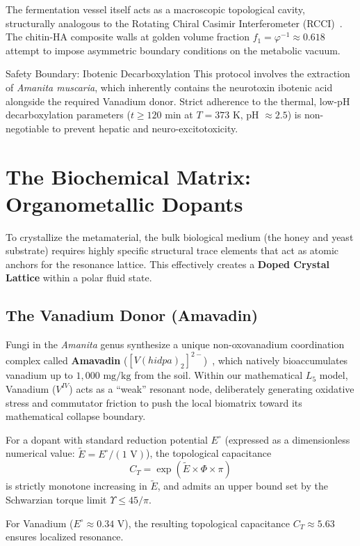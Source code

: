 The fermentation vessel itself acts as a macroscopic topological cavity, structurally analogous to the Rotating Chiral Casimir Interferometer (RCCI)~\cite{dwm_fst}. The chitin-HA composite walls at golden volume fraction $f_1 = \varphi^{-1} \approx 0.618$ attempt to impose asymmetric boundary conditions on the metabolic vacuum.

\begin{warningbox}{Safety Boundary: Ibotenic Decarboxylation}
This protocol involves the extraction of \textit{Amanita muscaria}, which inherently contains the neurotoxin ibotenic acid alongside the required Vanadium donor. Strict adherence to the thermal, low-pH decarboxylation parameters ($t \geq 120$ min at $T = 373$ K, pH $\approx 2.5$) is non-negotiable to prevent hepatic and neuro-excitotoxicity.
\end{warningbox}

\section{The Biochemical Matrix: Organometallic Dopants}

To crystallize the metamaterial, the bulk biological medium (the honey and yeast substrate) requires highly specific structural trace elements that act as atomic anchors for the resonance lattice. This effectively creates a \textbf{Doped Crystal Lattice} within a polar fluid state.

\subsection{The Vanadium Donor (Amavadin)}
Fungi in the \textit{Amanita} genus synthesize a unique non-oxovanadium coordination complex called \textbf{Amavadin} ($[V(hidpa)_2]^{2-}$)~\cite{Berry1999Amavadin}, which natively bioaccumulates vanadium up to $1,000\text{ mg/kg}$ from the soil. Within our mathematical $L_5$ model, Vanadium ($V^{IV}$) acts as a ``weak'' resonant node, deliberately generating oxidative stress and commutator friction to push the local biomatrix toward its mathematical collapse boundary.

\begin{theorem}\label{thm:ct}
For a dopant with standard reduction potential $E^\circ$ (expressed as a dimensionless numerical value: $\tilde{E} = E^\circ / (1\text{ V})$), the topological capacitance
\begin{equation}\label{eq:ct}
    C_T = \exp(\tilde{E} \times \Phi \times \pi)
\end{equation}
is strictly monotone increasing in $\tilde{E}$, and admits an upper bound set by the Schwarzian torque limit $\Upsilon \leq 45/\pi$.
\end{theorem}
For Vanadium ($E^\circ \approx 0.34\text{ V}$), the resulting topological capacitance $C_T \approx 5.63$ ensures localized resonance.

